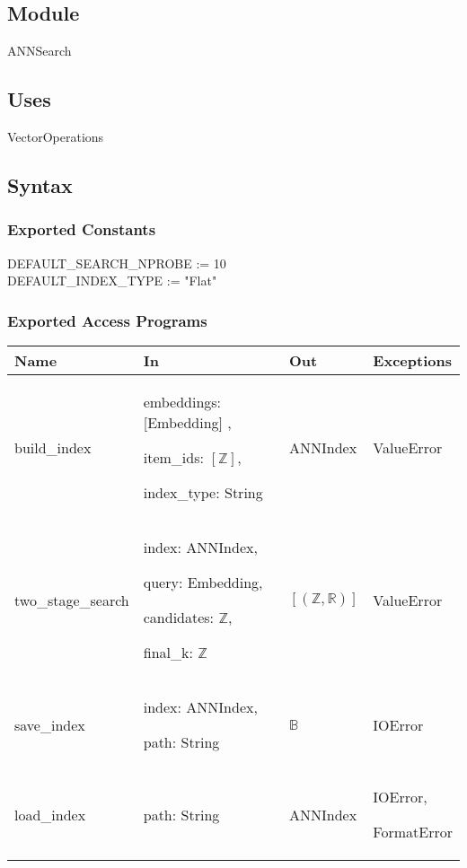 \documentclass[12pt, titlepage]{article}
\begin{document}
\subsection{Module}

ANNSearch

\subsection{Uses}
VectorOperations

\subsection{Syntax}

\subsubsection{Exported Constants}
DEFAULT\_SEARCH\_NPROBE := 10\\
DEFAULT\_INDEX\_TYPE := "Flat"
\subsubsection{Exported Access Programs}

\begin{center}
  \begin{tabular}{p{4cm} p{4cm} p{4cm} p{3cm}}
  \hline
  \textbf{Name} & \textbf{In} & \textbf{Out} & \textbf{Exceptions} \\
  \hline
  build\_index & embeddings: [Embedding] ,
  
  item\_ids: $[\mathbb{Z}]$,
  
  index\_type: String & ANNIndex & ValueError \\
  \hline
  two\_stage\_search & index: ANNIndex,
  
  query: Embedding,
  
  candidates: $\mathbb{Z}$,
  
  final\_k: $\mathbb{Z}$
   & $[(\mathbb{Z}, \mathbb{R})]$ & ValueError \\
  \hline
  save\_index & index: ANNIndex, 
  
  path: String & $\mathbb{B}$ & IOError \\
  \hline
  load\_index & path: String 
   & ANNIndex & IOError, 
   
   FormatError \\
  \hline
  \end{tabular}
  \end{center}
\end{document}
